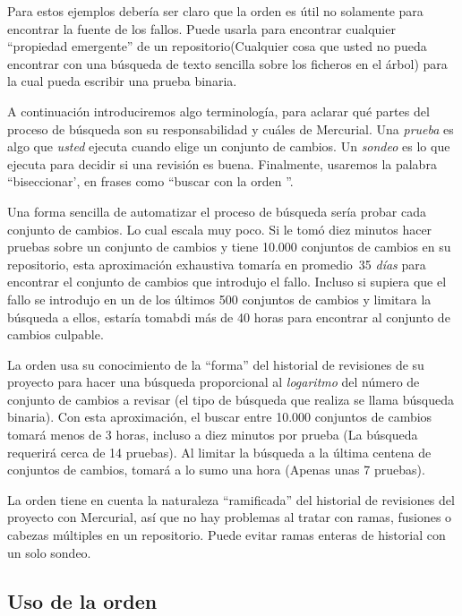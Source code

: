 Para estos ejemplos debería ser claro que la orden 
es útil no solamente para encontrar la fuente de los fallos. Puede
usarla para encontrar cualquier ``propiedad emergente'' de un
repositorio(Cualquier cosa que usted no pueda encontrar con una
búsqueda de texto sencilla sobre los ficheros en el árbol) para la
cual pueda escribir una prueba binaria.

A continuación introduciremos algo terminología, para aclarar qué
partes del proceso de búsqueda son su responsabilidad y cuáles de
Mercurial.  Una \emph{prueba} es algo que \emph{usted} ejecuta cuando
 elige un conjunto de cambios.  Un \emph{sondeo} es lo que
 ejecuta para decidir si una revisión es buena.  Finalmente,
usaremos la palabra ``biseccionar', en frases como ``buscar con la
orden ''.

Una forma sencilla de automatizar el proceso de búsqueda sería probar
cada conjunto de cambios.  Lo cual escala muy poco. Si le tomó diez
minutos hacer pruebas sobre un conjunto de cambios y tiene 10.000
conjuntos de cambios en su repositorio, esta aproximación exhaustiva
tomaría en promedio~35 \emph{días} para encontrar el conjunto de
cambios que introdujo el fallo. Incluso si supiera que el fallo se
introdujo en un de los últimos 500 conjuntos de cambios y limitara la
búsqueda a ellos, estaría tomabdi más de 40 horas para encontrar al
conjunto de cambios culpable.

La orden  usa su conocimiento de la ``forma'' del
historial de revisiones de su proyecto para hacer una búsqueda
proporcional al \emph{logaritmo} del número de conjunto de cambios a
revisar (el tipo de búsqueda que realiza se llama búsqueda
binaria). Con esta aproximación, el buscar entre 10.000 conjuntos de
cambios tomará menos de 3 horas, incluso a diez minutos por prueba (La
búsqueda requerirá cerca de 14 pruebas). Al limitar la búsqueda a la
última centena de conjuntos de cambios, tomará a lo sumo una
hora (Apenas unas 7 pruebas).

La orden  tiene en cuenta la naturaleza ``ramificada''
del historial de revisiones del proyecto con Mercurial, así que no
hay problemas al tratar con ramas, fusiones o cabezas múltiples en un
repositorio.  Puede evitar ramas enteras de historial con un solo
sondeo.

\subsection{Uso de la orden }

